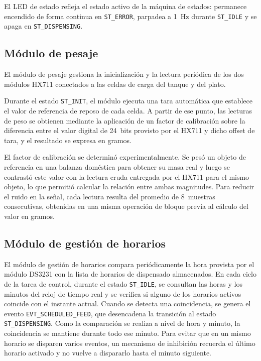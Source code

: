 El LED de estado refleja el estado activo de la máquina de estados: permanece
encendido de forma continua en \texttt{ST\_ERROR}, parpadea a 1~Hz durante
\texttt{ST\_IDLE} y se apaga en \texttt{ST\_DISPENSING}.

\subsection{Módulo de pesaje}

El módulo de pesaje gestiona la inicialización y la lectura periódica de los dos
módulos HX711 conectados a las celdas de carga del tanque y del plato.

Durante el estado \texttt{ST\_INIT}, el módulo ejecuta una tara automática que
establece el valor de referencia de reposo de cada celda. A partir de ese
punto, las lecturas de peso se obtienen mediante la aplicación de un factor de
calibración sobre la diferencia entre el valor digital de 24~bits provisto por el
HX711 y dicho offset de tara, y el resultado se expresa en gramos.

El factor de calibración se determinó experimentalmente. Se pesó un objeto de
referencia en una balanza doméstica para obtener su masa real y luego se contrastó
este valor con la lectura cruda entregada por el HX711 para el mismo objeto, lo que
permitió calcular la relación entre ambas magnitudes. Para reducir el ruido en la
señal, cada lectura resulta del promedio de 8~muestras consecutivas, obtenidas en
una misma operación de bloque previa al cálculo del valor en gramos.

\subsection{Módulo de gestión de horarios}

El módulo de gestión de horarios compara periódicamente la hora provista por el
módulo DS3231 con la lista de horarios de dispensado almacenados. En cada ciclo
de la tarea de control, durante el estado \texttt{ST\_IDLE}, se consultan las
horas y los minutos del reloj de tiempo real y se verifica si alguno de los
horarios activos coincide con el instante actual. Cuando se detecta una
coincidencia, se genera el evento \texttt{EVT\_SCHEDULED\_FEED}, que desencadena
la transición al estado \texttt{ST\_DISPENSING}. Como la comparación se realiza a nivel de hora y minuto, la coincidencia se
mantiene durante todo ese minuto. Para evitar que en un mismo horario se disparen
varios eventos, un mecanismo de inhibición recuerda el último horario activado y
no vuelve a dispararlo hasta el minuto siguiente.

